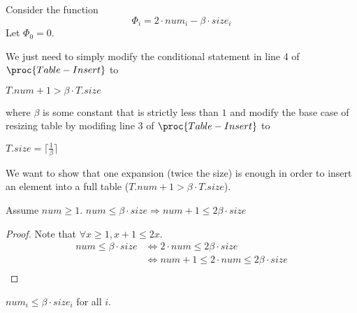 Consider the function
\begin{equation*}
    \Phi_i = 2 \cdot num_i - \beta \cdot size_i
\end{equation*}
Let $\Phi_0 = 0$.

We just need to simply modify the conditional statement 
in line 4 of $\proc{Table-Insert}$ to 
\begin{codebox}
    \zi \If $T.num + 1 > \beta \cdot T.size$
\end{codebox}
where $\beta$ is some constant that is strictly less than $1$
and modify the base case of resizing table
by modifing line 3 of $\proc{Table-Insert}$ to 
\begin{codebox}
    \zi \If $T.size = \lceil \frac{1}{\beta} \rceil$
\end{codebox}

We want to show that one expansion (twice the size) is enough
in order to insert an element into a full table ($T.num + 1 > \beta \cdot T.size$).

\begin{lemma}
    Assume $num \geq 1$.
    $num \leq \beta \cdot size \Longrightarrow
    num + 1 \leq 2 \beta \cdot size$ 
\end{lemma}

\begin{proof}
    Note that $\forall x \geq 1, x + 1 \leq 2x$.
    \begin{equation*}
    \begin{split}
        num \leq \beta \cdot size & \Longleftrightarrow 2 \cdot num \leq 2 \beta \cdot size \\
        & \Longleftrightarrow num + 1 \leq 2 \cdot num \leq 2 \beta \cdot size \\
    \end{split}
    \end{equation*}
\end{proof}

\begin{claim}
    $num_i \leq \beta \cdot size_i$ for all $i$.
\end{claim}

